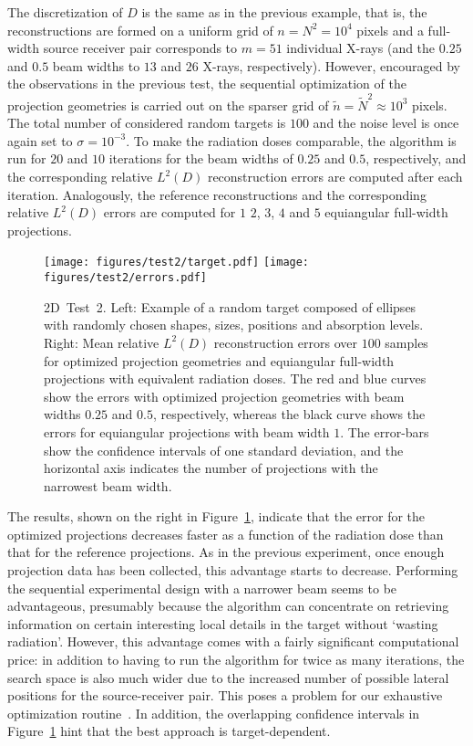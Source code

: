 \documentclass[final]{siamltex}
\begin{document}
 The discretization of $D$ is the same as in the previous example, that is, the reconstructions are formed on a uniform grid of $n=N^2=10^4$ pixels and a full-width source receiver pair corresponds to $m=51$ individual X-rays (and the $0.25$ and $0.5$ beam widths to $13$ and $26$ X-rays, respectively). However, encouraged by the observations in the previous test, the sequential optimization of the projection geometries is carried out on the sparser grid of $\tilde{n} = \tilde{N}^2 \approx 10^3$ pixels. The total number of considered random targets is $100$ and the noise level is once again set to $\sigma = 10^{-3}$. To make the radiation doses comparable, the algorithm is run for $20$ and $10$ iterations for the beam widths of $0.25$ and $0.5$, respectively, and the corresponding relative $L^2(D)$ reconstruction errors are computed after each iteration. Analogously, the reference reconstructions and the corresponding relative $L^2(D)$ errors are computed for $1$ $2$, $3$, $4$ and $5$ equiangular full-width projections.

 \begin{figure}
	\centering
	\texttt{[image: figures/test2/target.pdf]}
	\texttt{[image: figures/test2/errors.pdf]}
	\caption{{\sc 2D~Test~2.} Left: Example of a random target composed of  ellipses with randomly chosen shapes, sizes, positions and absorption levels. Right: Mean relative $L^2(D)$ reconstruction errors over $100$ samples for optimized projection geometries and equiangular full-width projections with equivalent radiation doses. The red and blue curves show the errors with optimized projection geometries with beam widths $0.25$ and $0.5$, respectively, whereas the black curve shows the errors for equiangular projections with beam width $1$. The error-bars show the confidence intervals of one standard deviation, and the horizontal axis indicates the number of projections with the narrowest beam width.}
	\label{fig:test2}
\end{figure}


 The results, shown on the right in Figure~\ref{fig:test2}, indicate that the error for the optimized projections decreases faster as a function of the radiation dose than that for the reference projections. As in the previous experiment, once enough projection data has been collected, this advantage starts to decrease. Performing the sequential experimental design with a narrower beam seems to be advantageous, presumably because the algorithm can concentrate on retrieving information on certain interesting local details in the target without `wasting radiation'. However, this advantage comes with a fairly significant computational price: in addition to having to run the algorithm for twice as many iterations, the search space is also much wider due to the increased number of possible lateral positions for the source-receiver pair. This poses a problem for our exhaustive optimization routine~\cite{Burger21}. In addition, the overlapping confidence intervals in Figure~\ref{fig:test2} hint that the best approach is target-dependent.
\end{document}
